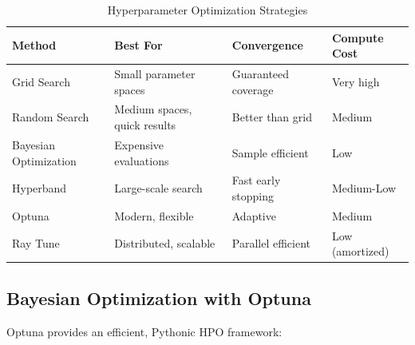 \begin{table}[h]
\centering
\caption{Hyperparameter Optimization Strategies}
\label{tab:hpo_strategies}
\small
\begin{tabular}{@{}lp{3.5cm}p{2.5cm}p{3cm}@{}}
\toprule
\textbf{Method} & \textbf{Best For} & \textbf{Convergence} & \textbf{Compute Cost} \\
\midrule
Grid Search & Small parameter spaces & Guaranteed coverage & Very high \\
Random Search & Medium spaces, quick results & Better than grid & Medium \\
Bayesian Optimization & Expensive evaluations & Sample efficient & Low \\
Hyperband & Large-scale search & Fast early stopping & Medium-Low \\
Optuna & Modern, flexible & Adaptive & Medium \\
Ray Tune & Distributed, scalable & Parallel efficient & Low (amortized) \\
\bottomrule
\end{tabular}
\end{table}

\subsection{Bayesian Optimization with Optuna}

Optuna provides an efficient, Pythonic HPO framework:

